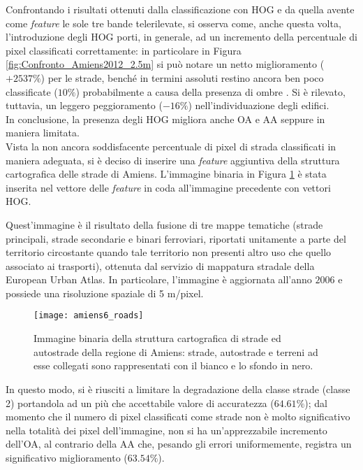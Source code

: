 Confrontando i risultati ottenuti dalla classificazione con HOG e da
quella avente come \emph{feature} le sole tre bande telerilevate, si
osserva come, anche questa volta, l'introduzione degli HOG porti, in
generale, ad un incremento della percentuale di pixel classificati
correttamente: in particolare in Figura
\ref{fig:Confronto_Amiens2012_2.5m} si può notare un netto
miglioramento ($+2537\%$) per le strade, benché in termini assoluti
restino ancora ben poco classificate ($10\%$) probabilmente a causa
della presenza di ombre . Si è rilevato, tuttavia, un leggero
peggioramento ($-16\%$) nell'individuazione degli edifici. \\ In
conclusione, la presenza degli HOG migliora anche OA e AA seppure in
maniera limitata. \\

Vista la non ancora soddisfacente percentuale di pixel di strada
classificati in maniera adeguata, si è deciso di inserire una
\emph{feature} aggiuntiva della struttura cartografica delle strade di
Amiens. L'immagine binaria in Figura \ref{fig:immagine_roads} è stata
inserita nel vettore delle \emph{feature} in coda all'immagine
precedente con vettori HOG.

Quest'immagine è il risultato della fusione di tre mappe tematiche
(strade principali, strade secondarie e binari ferroviari, riportati
unitamente a parte del territorio circostante quando tale territorio
non presenti altro uso che quello associato ai trasporti), ottenuta
dal servizio di mappatura stradale della European Urban Atlas. In
particolare, l'immagine è aggiornata all'anno $2006$ e possiede una
risoluzione spaziale di 5 m/pixel.

\begin{figure}[!ht]
\center
\texttt{[image: amiens6\_roads]}
\caption{Immagine binaria della struttura cartografica di strade ed autostrade della regione di
Amiens: strade, autostrade e terreni ad esse collegati sono rappresentati con il bianco e lo sfondo in
nero.}

\label{fig:immagine_roads}

\end{figure}

In questo modo, si è riusciti a limitare la degradazione della classe
strade (classe 2) portandola ad un più che accettabile valore di
accuratezza ($64.61\%$); dal momento che il numero di pixel
classificati come strade non è molto significativo nella totalità dei
pixel dell'immagine, non si ha un'apprezzabile incremento dell'OA,
al
contrario della AA che, pesando gli errori uniformemente, registra un
significativo miglioramento ($63.54\%$).

